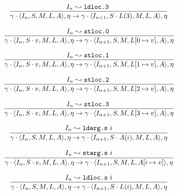 \documentclass[declaration,shortabstract,english,mgr]{iithesis}
\newcommand{\mstate}[5] {
	\langle#1, #2, #3, #4, #5\rangle
}
\newcommand{\ipointsto}[3] {
	#1 \leadsto \texttt{#2} \text{ } #3
}
\newcommand{\setarrayitem}[3] {
	#1[#2 \mapsto #3]
}
\begin{document}
\begin{equation}
\label{eq:semantics_ldloc3}
	\infer{
		\gamma \cdot \mstate{I_n}{S}{M}{L}{A}, \eta
			\rightarrow
		\gamma \cdot \mstate{I_{n+1}}{S \cdot L(3)}{M}{L}{A}, \eta
	}
	{\ipointsto{I_n}{ldloc.3}}
\end{equation}

\begin{equation}
\label{eq:semantics_stloc0}
	\infer{
		\gamma \cdot \mstate{I_n}{S \cdot v}{M}{L}{A}, \eta
			\rightarrow
		\gamma \cdot \mstate{I_{n+1}}{S}{M}{\setarrayitem{L}{0}{v}}{A}, \eta
	}
	{\ipointsto{I_n}{stloc.0}}
\end{equation}

\begin{equation}
\label{eq:semantics_stloc1}
	\infer{
		\gamma \cdot \mstate{I_n}{S \cdot v}{M}{L}{A}, \eta
			\rightarrow
		\gamma \cdot \mstate{I_{n+1}}{S}{M}{\setarrayitem{L}{1}{v}}{A}, \eta
	}
	{\ipointsto{I_n}{stloc.1}}
\end{equation}

\begin{equation}
\label{eq:semantics_stloc2}
	\infer{
		\gamma \cdot \mstate{I_n}{S \cdot v}{M}{L}{A}, \eta
			\rightarrow
		\gamma \cdot \mstate{I_{n+1}}{S}{M}{\setarrayitem{L}{2}{v}}{A}, \eta
	}
	{\ipointsto{I_n}{stloc.2}}
\end{equation}

\begin{equation}
\label{eq:semantics_stloc3}
	\infer{
		\gamma \cdot \mstate{I_n}{S \cdot v}{M}{L}{A}, \eta
			\rightarrow
		\gamma \cdot \mstate{I_{n+1}}{S}{M}{\setarrayitem{L}{3}{v}}{A}, \eta
	}
	{\ipointsto{I_n}{stloc.3}}
\end{equation}

\begin{equation}
\label{eq:semantics_ldargs}
	\infer{
		\gamma \cdot \mstate{I_n}{S}{M}{L}{A}, \eta
			\rightarrow
		\gamma \cdot \mstate{I_{n+1}}{S \cdot A(i)}{M}{L}{A}, \eta
	}
	{\ipointsto{I_n}{ldarg.s}{i}}
\end{equation}

\begin{equation}
\label{eq:semantics_stargs}
	\infer{
		\gamma \cdot \mstate{I_n}{S \cdot v}{M}{L}{A}, \eta
			\rightarrow
		\gamma \cdot \mstate{I_{n+1}}{S}{M}{L}{\setarrayitem{A}{i}{v}}, \eta
	}
	{\ipointsto{I_n}{starg.s}{i}}
\end{equation}

\begin{equation}
\label{eq:semantics_ldlocs}
	\infer{
		\gamma \cdot \mstate{I_n}{S}{M}{L}{A}, \eta
			\rightarrow
		\gamma \cdot \mstate{I_{n+1}}{S \cdot L(i)}{M}{L}{A}, \eta
	}
	{\ipointsto{I_n}{ldloc.s}{i}}
\end{equation}
\end{document}
